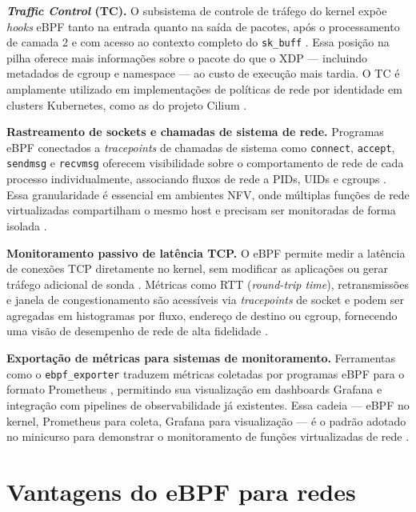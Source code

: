 \textbf{\textit{Traffic Control} (TC).}
O subsistema de controle de tráfego do kernel expõe \textit{hooks} eBPF tanto na
entrada quanto na saída de pacotes, após o processamento de camada 2 e com acesso
ao contexto completo do \texttt{sk\_buff} \cite{linuxkernel2024}.
Essa posição na pilha oferece mais informações sobre o pacote do que o XDP ---
incluindo metadados de cgroup e namespace --- ao custo de execução mais tardia.
O TC é amplamente utilizado em implementações de políticas de rede por identidade
em clusters Kubernetes, como as do projeto Cilium \cite{cassagnes2020}.

\textbf{Rastreamento de sockets e chamadas de sistema de rede.}
Programas eBPF conectados a \textit{tracepoints} de chamadas de sistema como
\texttt{connect}, \texttt{accept}, \texttt{sendmsg} e \texttt{recvmsg} oferecem
visibilidade sobre o comportamento de rede de cada processo individualmente,
associando fluxos de rede a PIDs, UIDs e cgroups \cite{gregg2019}.
Essa granularidade é essencial em ambientes NFV, onde múltiplas funções de rede
virtualizadas compartilham o mesmo host e precisam ser monitoradas de forma isolada
\cite{venancio2021}.

\textbf{Monitoramento passivo de latência TCP.}
O eBPF permite medir a latência de conexões TCP diretamente no kernel, sem
modificar as aplicações ou gerar tráfego adicional de sonda
\cite{research2024}.
Métricas como RTT (\textit{round-trip time}), retransmissões e janela de
congestionamento são acessíveis via \textit{tracepoints} de socket e podem ser
agregadas em histogramas por fluxo, endereço de destino ou cgroup, fornecendo
uma visão de desempenho de rede de alta fidelidade \cite{gregg2020}.

\textbf{Exportação de métricas para sistemas de monitoramento.}
Ferramentas como o \texttt{ebpf\_exporter} \cite{ebpfexporter} traduzem métricas
coletadas por programas eBPF para o formato Prometheus \cite{prometheusdocs},
permitindo sua visualização em dashboards Grafana \cite{grafanadocs} e integração
com pipelines de observabilidade já existentes.
Essa cadeia --- eBPF no kernel, Prometheus para coleta, Grafana para visualização
--- é o padrão adotado no minicurso para demonstrar o monitoramento de funções
virtualizadas de rede \cite{alves2026tcc}.

\section{Vantagens do eBPF para redes}

